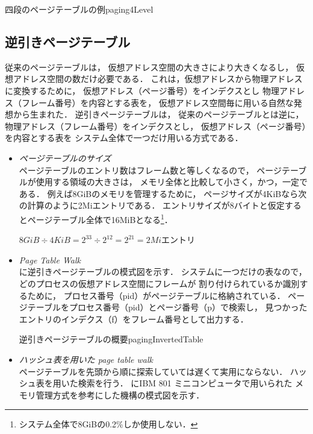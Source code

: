 {四段のページテーブルの例}{paging4Level}

\subsection{逆引きページテーブル}
従来のページテーブルは，
仮想アドレス空間の大きさにより大きくなるし，
仮想アドレス空間の数だけ必要である．
これは，仮想アドレスから物理アドレスに変換するために，
仮想アドレス（ページ番号）をインデクスとし
物理アドレス（フレーム番号）を内容とする表を，
仮想アドレス空間毎に用いる自然な発想から生まれた．
逆引きページテーブルは，
従来のページテーブルとは逆に，
物理アドレス（フレーム番号）をインデクスとし，
仮想アドレス（ページ番号）を内容とする表を
システム全体で一つだけ用いる方式である．

\begin{itemize}
\item \emph{ページテーブルのサイズ} \\
ページテーブルのエントリ数はフレーム数と等しくなるので，
ページテーブルが使用する領域の大きさは，
メモリ全体と比較して小さく，かつ，一定である．
例えば8GiBのメモリを管理するために，
ページサイズが4KiBなら次の計算のように2Miエントリである．
エントリサイズが8バイトと仮定するとページテーブル全体で16MiBとなる\footnote{
システム全体で8GiBの0.2\%しか使用しない．}．

\centerline{$8GiB \div 4KiB = 2^{33} \div 2^{12} = 2^{21} = 2Mi$エントリ}

\item \emph{Page Table Walk} \\
に逆引きページテーブルの模式図を示す．
システムに一つだけの表なので，
どのプロセスの仮想アドレス空間にフレームが
割り付けられているか識別するために，
プロセス番号（pid）がページテーブルに格納されている．
ページテーブルをプロセス番号（pid）とページ番号（p）で検索し，
見つかったエントリのインデクス（f）をフレーム番号として出力する．

{逆引きページテーブルの概要}{pagingInvertedTable}

\item \emph{ハッシュ表を用いた page table walk} \\
ページテーブルを先頭から順に探索していては遅くて実用にならない．
ハッシュ表を用いた検索を行う．
にIBM 801 ミニコンピュータで用いられた
メモリ管理方式\cite{invertedPageTable}を参考にした機構の模式図を示す．


\end{itemize}
